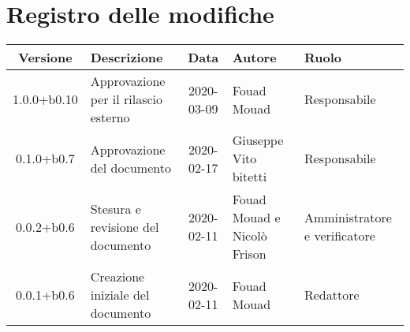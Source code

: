 \section*{Registro delle modifiche}

\begin{center}
	\begin{longtable}{|c|p{3.5cm}|c|p{3cm}|p{3cm}|}
	\hline
	\rowcolor{lighter-grayer}
	\textbf{Versione} & \textbf{Descrizione} & \textbf{Data} & \textbf{Autore} & \textbf{Ruolo} \\
	\hline
	\endfirsthead


	1.0.0+b0.10 & Approvazione per il rilascio esterno & 2020-03-09 & Fouad Mouad & Responsabile \\
	\hline
	0.1.0+b0.7 & Approvazione del documento & 2020-02-17 & Giuseppe Vito bitetti & Responsabile \\
	\hline
	0.0.2+b0.6 & Stesura e revisione del documento & 2020-02-11 & Fouad Mouad e Nicolò Frison & Amministratore e verificatore \\
	\hline
	0.0.1+b0.6 & Creazione iniziale del documento & 2020-02-11 & Fouad Mouad & Redattore \\
	\hline

	\end{longtable}
\end{center}